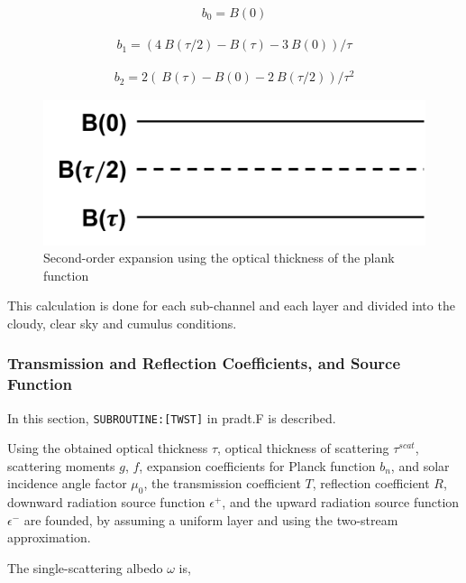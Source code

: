 \begin{eqnarray}
b_{0}=B(0)
\end{eqnarray}

\begin{eqnarray}
b_{1}=(4{~B}(\tau / 2)-{B}(\tau)-3{~B}(0)) / \tau
\end{eqnarray}

\begin{eqnarray}
b_{2}=2({~B}(\tau)-{B}(0)-2{~B}(\tau / 2)) / \tau^{2}
\end{eqnarray}

\begin{figure}
\centering
\includegraphics{Prad_Fig2.png}
\caption{Second-order expansion using the optical thickness of the plank
function}
\end{figure}

This calculation is done for each sub-channel and each layer and divided
into the cloudy, clear sky and cumulus conditions.

\hypertarget{transmission-and-reflection-coefficients-and-source-function}{%
\subsubsection{Transmission and Reflection Coefficients, and Source
Function}\label{transmission-and-reflection-coefficients-and-source-function}}

In this section, \texttt{SUBROUTINE:{[}TWST{]}} in pradt.F is described.

Using the obtained optical thickness \(\tau\), optical thickness of
scattering \(\tau^{scat}\), scattering moments \(g\), \(f\), expansion
coefficients for Planck function \(b_n\), and solar incidence angle
factor \(\mu_{0}\), the transmission coefficient \(T\), reflection
coefficient \(R\), downward radiation source function \(\epsilon^{+}\),
and the upward radiation source function \(\epsilon^{-}\) are founded,
by assuming a uniform layer and using the two-stream approximation.

The single-scattering albedo \(\omega\) is,

